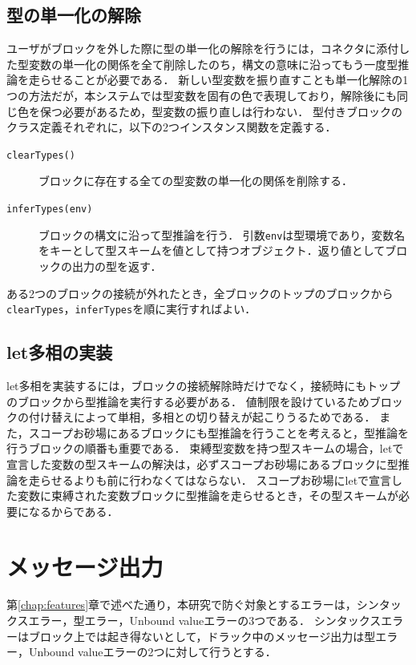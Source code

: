 \subsection*{型の単一化の解除}
ユーザがブロックを外した際に型の単一化の解除を行うには，コネクタに添付した型変数の単一化の関係を全て削除したのち，構文の意味に沿ってもう一度型推論を走らせることが必要である．
新しい型変数を振り直すことも単一化解除の1つの方法だが，本システムでは型変数を固有の色で表現しており，解除後にも同じ色を保つ必要があるため，型変数の振り直しは行わない．
型付きブロックのクラス定義それぞれに，以下の2つインスタンス関数を定義する．
\begin{description}
 \item[{\tt clearTypes()}] ブロックに存在する全ての型変数の単一化の関係を削除する．
 \item[{\tt inferTypes(env)}] ブロックの構文に沿って型推論を行う．
引数{\tt env}は型環境であり，変数名をキーとして型スキームを値として持つオブジェクト．返り値としてブロックの出力の型を返す．
\end{description}

ある2つのブロックの接続が外れたとき，全ブロックのトップのブロックから{\tt clearTypes}，{\tt inferTypes}を順に実行すればよい．

\subsection*{let多相の実装} %
let多相を実装するには，ブロックの接続解除時だけでなく，接続時にもトップのブロックから型推論を実行する必要がある．
値制限を設けているためブロックの付け替えによって単相，多相との切り替えが起こりうるためである．
また，スコープお砂場にあるブロックにも型推論を行うことを考えると，型推論を行うブロックの順番も重要である．
束縛型変数を持つ型スキームの場合，letで宣言した変数の型スキームの解決は，必ずスコープお砂場にあるブロックに型推論を走らせるよりも前に行わなくてはならない．
スコープお砂場にletで宣言した変数に束縛された変数ブロックに型推論を走らせるとき，その型スキームが必要になるからである．

\section {メッセージ出力}

第\ref{chap:features}章で述べた通り，本研究で防ぐ対象とするエラーは，シンタックスエラー，型エラー，Unbound valueエラーの3つである．
シンタックスエラーはブロック上では起き得ないとして，ドラック中のメッセージ出力は型エラー，Unbound valueエラーの2つに対して行うとする．

